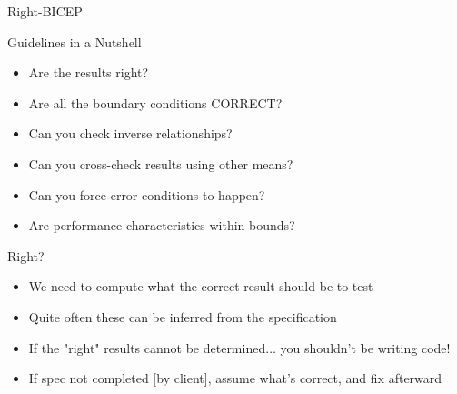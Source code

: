 \begin{frame}{Right-BICEP}
  \begin{block}{Guidelines in a Nutshell}
    \begin{itemize}
    \item {} Are the results right?
    \item {} Are all the \alert{b}oundary conditions CORRECT?
    \item {} Can you check \alert{i}nverse relationships?
    \item {} Can you \alert{c}ross-check results using other
      means?
    \item {} Can you force \alert{e}rror conditions to happen?
    \item {} Are \alert{p}erformance characteristics within bounds?
    \end{itemize}
  \end{block}
  
  \begin{block}{Right?}
    \begin{itemize}
    \item We need to compute what the correct result should be to test
    \item Quite often these can be inferred from the specification
    \item If the "right" results cannot be determined$\ldots$
      you shouldn't be writing code!
    \item If spec not completed [by client], assume what's correct, and
      fix afterward
    \end{itemize}
  \end{block}
\end{frame}
